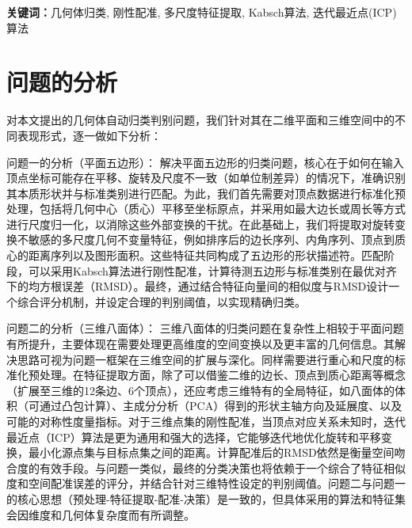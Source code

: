 \vspace{\fill} %
\noindent %
\textbf{关键词：}几何体归类, 刚性配准, 多尺度特征提取, Kabsch算法, 迭代最近点(ICP)算法
\clearpage %

\section{问题的分析}
对本文提出的几何体自动归类判别问题，我们针对其在二维平面和三维空间中的不同表现形式，逐一做如下分析：

问题一的分析（平面五边形）：
解决平面五边形的归类问题，核心在于如何在输入顶点坐标可能存在平移、旋转及尺度不一致（如单位制差异）的情况下，准确识别其本质形状并与标准类别进行匹配。为此，我们首先需要对顶点数据进行标准化预处理，包括将几何中心（质心）平移至坐标原点，并采用如最大边长或周长等方式进行尺度归一化，以消除这些外部变换的干扰。在此基础上，我们将提取对旋转变换不敏感的多尺度几何不变量特征，例如排序后的边长序列、内角序列、顶点到质心的距离序列以及图形面积。这些特征共同构成了五边形的形状描述符。匹配阶段，可以采用Kabsch算法进行刚性配准，计算待测五边形与标准类别在最优对齐下的均方根误差（RMSD）。最终，通过结合特征向量间的相似度与RMSD设计一个综合评分机制，并设定合理的判别阈值，以实现精确归类。

问题二的分析（三维八面体）：
三维八面体的归类问题在复杂性上相较于平面问题有所提升，主要体现在需要处理更高维度的空间变换以及更丰富的几何信息。其解决思路可视为问题一框架在三维空间的扩展与深化。同样需要进行重心和尺度的标准化预处理。在特征提取方面，除了可以借鉴二维的边长、顶点到质心距离等概念（扩展至三维的12条边、6个顶点），还应考虑三维特有的全局特征，如八面体的体积（可通过凸包计算）、主成分分析（PCA）得到的形状主轴方向及延展度、以及可能的对称性度量指标。对于三维点集的刚性配准，当顶点对应关系未知时，迭代最近点（ICP）算法是更为通用和强大的选择，它能够迭代地优化旋转和平移变换，最小化源点集与目标点集之间的距离。计算配准后的RMSD依然是衡量空间吻合度的有效手段。与问题一类似，最终的分类决策也将依赖于一个综合了特征相似度和空间配准误差的评分，并结合针对三维特性设定的判别阈值。问题二与问题一的核心思想（预处理-特征提取-配准-决策）是一致的，但具体采用的算法和特征集会因维度和几何体复杂度而有所调整。

